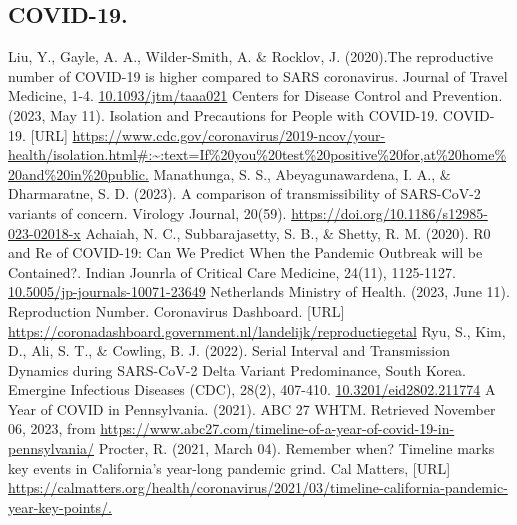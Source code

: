 \documentclass[11pt]{article}
\begin{document}
\begin{thebibliography}{100}
    \subsection*{COVID-19.}
     Liu, Y., Gayle, A. A., Wilder-Smith, A. \& Rocklov, J. (2020).The reproductive number of COVID-19 is higher
    compared to SARS coronavirus. Journal of Travel Medicine, 1-4. \url{10.1093/jtm/taaa021}
     Centers for Disease Control and Prevention. (2023, May 11). Isolation and Precautions for People with COVID-19. COVID-19. [URL] \url{https://www.cdc.gov/coronavirus/2019-ncov/your-health/isolation.html#:~:text=If%20you%20test%20positive%20for,at%20home%20and%20in%20public.}
     Manathunga, S. S., Abeyagunawardena, I. A., \& Dharmaratne, S. D. (2023). A comparison of transmissibility of SARS-CoV-2 variants of concern. Virology Journal, 20(59). \url{https://doi.org/10.1186/s12985-023-02018-x}
     Achaiah, N. C., Subbarajasetty, S. B., \& Shetty, R. M. (2020). R0 and Re of COVID-19: Can We Predict When the Pandemic Outbreak will be Contained?. Indian Jounrla of Critical Care Medicine, 24(11), 1125-1127. \url{10.5005/jp-journals-10071-23649}
     Netherlands Ministry of Health. (2023, June 11). Reproduction Number. Coronavirus Dashboard. [URL] \url{https://coronadashboard.government.nl/landelijk/reproductiegetal}
     Ryu, S., Kim, D.,  Ali, S. T., \& Cowling, B. J. (2022). Serial Interval and Transmission
    Dynamics during SARS-CoV-2 Delta
    Variant Predominance, South Korea. Emergine Infectious Diseases (CDC), 28(2), 407-410. \url{10.3201/eid2802.211774}
     A Year of COVID in Pennsylvania. (2021). ABC 27 WHTM. Retrieved November 06, 2023, from \url{https://www.abc27.com/timeline-of-a-year-of-covid-19-in-pennsylvania/}
     Procter, R. (2021, March 04). Remember when? Timeline marks key events in California’s year-long pandemic grind. Cal Matters, [URL] \url{https://calmatters.org/health/coronavirus/2021/03/timeline-california-pandemic-year-key-points/.}
    

\end{thebibliography}
\end{document}
